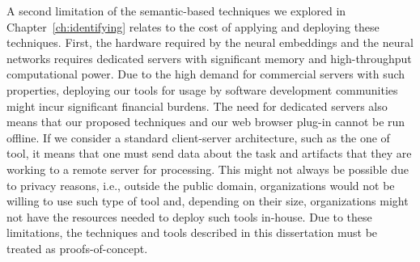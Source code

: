 A second limitation of the semantic-based techniques we explored in Chapter~\ref{ch:identifying}
relates to the cost of applying and deploying these techniques. 
First, the hardware required by 
the neural embeddings and the neural networks
requires dedicated servers with significant 
memory and high-throughput computational power. Due to the high demand for commercial servers with such properties, deploying our tools for usage by software development communities might incur significant financial burdens. 
The need for dedicated servers also means that our proposed techniques and our web browser plug-in cannot be run offline. If we consider a standard client-server architecture, such as the one of \acs{tool}, it means that one must send data about the task and artifacts that they are working to a remote server for processing. This might not always be possible due to privacy reasons, i.e., outside the public domain, organizations would not be willing to use such type of tool and, depending on their size,  organizations might not have the resources needed to deploy such tools in-house. Due to these limitations, the techniques and tools described in this dissertation 
must be treated as proofs-of-concept.

